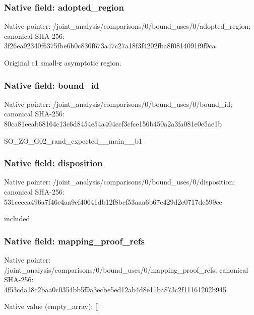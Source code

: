 \documentclass[10pt,a4paper]{article}
\begin{document}
\subsubsection{Native field: adopted\_\allowbreak{}region}
Native pointer: /joint\_\allowbreak{}analysis/comparisons/0/bound\_\allowbreak{}uses/0/adopted\_\allowbreak{}region; canonical SHA-256: 3f26ea92340f6375fbe6b0c830f673a47c27a18f3f4202fba8f0814091f9f9ca

\begingroup\raggedright\sloppy Original c1 small-{\AtlasUnicodeText ε}\allowbreak{} asymptotic region.\par\endgroup

\subsubsection{Native field: bound\_\allowbreak{}id}
Native pointer: /joint\_\allowbreak{}analysis/comparisons/0/bound\_\allowbreak{}uses/0/bound\_\allowbreak{}id; canonical SHA-256: 80ca81eeab68164c13c6d8454e54a404ccf3cfce156b450a2a3fa081e0e5ae1b

\begingroup\raggedright\sloppy SO\_\allowbreak{}ZO\_\allowbreak{}G02\_\allowbreak{}rand\_\allowbreak{}expected\_\allowbreak{}\_\allowbreak{}main\_\allowbreak{}\_\allowbreak{}b1\par\endgroup

\subsubsection{Native field: disposition}
Native pointer: /joint\_\allowbreak{}analysis/comparisons/0/bound\_\allowbreak{}uses/0/disposition; canonical SHA-256: 531cecca496a7f46e4aa9ef40641db12f8bef53aaa6b67c429d2c0717dc599ce

\begingroup\raggedright\sloppy included\par\endgroup

\subsubsection{Native field: mapping\_\allowbreak{}proof\_\allowbreak{}refs}
Native pointer: /joint\_\allowbreak{}analysis/comparisons/0/bound\_\allowbreak{}uses/0/mapping\_\allowbreak{}proof\_\allowbreak{}refs; canonical SHA-256: 4f53cda18c2baa0c0354bb5f9a3ecbe5ed12ab4d8e11ba873c2f11161202b945

Native value (empty\_\allowbreak{}array): []
\end{document}
